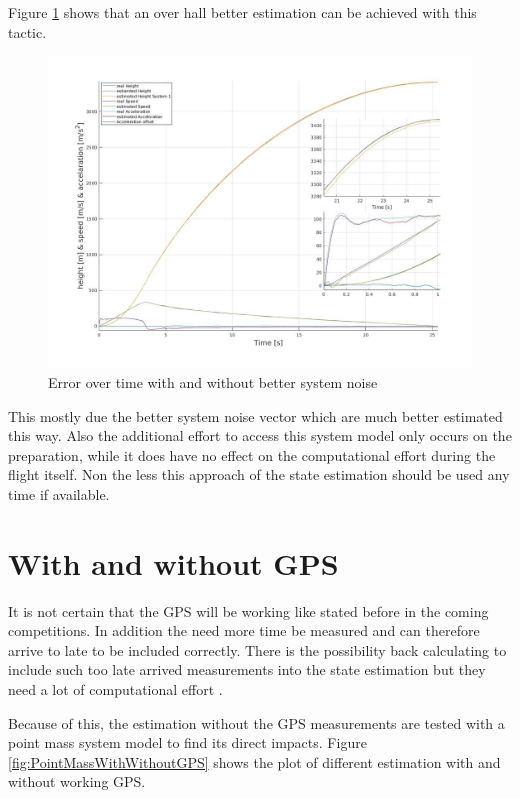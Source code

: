 Figure \ref{fig:PointMassVSBetterNoise} shows that an over hall better estimation can be achieved with this tactic. 
\begin{figure}[h!]
 \centering
 \includegraphics[width=.8\textwidth]{./Pictures/PointMassVSBetterNoise.jpg}
 \caption{Error over time with and without better system noise}
 \label{fig:PointMassVSBetterNoise}
\end{figure}
This mostly due the better system noise vector which are much better estimated this way.
Also the additional effort to access this system model only occurs on the preparation,
while it does have no effect on the computational effort during the flight itself.
Non the less this approach of the state estimation should be used any time if available.

\newpage
\section{With and without GPS}
It is not certain that the GPS will be working like stated before in the coming competitions.
In addition the need more time be measured and can therefore arrive to late to be included correctly.
There is the possibility back calculating to include such too late arrived measurements into the state estimation but they need a lot of computational effort \cite{SimonDan2006Ose:}.

Because of this, the estimation without the GPS measurements are tested with a point mass system model to find its direct impacts.
Figure \ref{fig:PointMassWithWithoutGPS} shows the plot of different estimation with and without working GPS.

